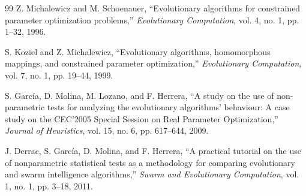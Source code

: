 \documentclass[journal]{IEEEtran}
\begin{document}
\begin{thebibliography}{99}
Z. Michalewicz and M. Schoenauer, ``Evolutionary algorithms for constrained parameter optimization problems,'' \emph{Evolutionary Computation}, vol. 4, no. 1, pp. 1--32, 1996.

S. Koziel and Z. Michalewicz, ``Evolutionary algorithms, homomorphous mappings, and constrained parameter optimization,'' \emph{Evolutionary Computation}, vol. 7, no. 1, pp. 19--44, 1999.

S. Garc\'{i}a, D. Molina, M. Lozano, and F. Herrera, ``A study on the use of non-parametric tests for analyzing the evolutionary algorithms' behaviour: A case study on the CEC'2005 Special Session on Real Parameter Optimization,'' \emph{Journal of Heuristics}, vol. 15, no. 6, pp. 617--644, 2009.

J. Derrac, S. Garc\'{i}a, D. Molina, and F. Herrera, ``A practical tutorial on the use of nonparametric statistical tests as a methodology for comparing evolutionary and swarm intelligence algorithms,'' \emph{Swarm and Evolutionary Computation}, vol. 1, no. 1, pp. 3--18, 2011.

\end{thebibliography}
\end{document}
